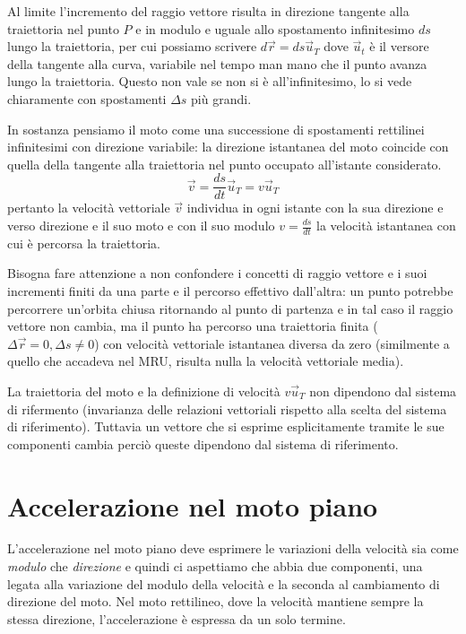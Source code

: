 \documentclass[class=book, crop=false, oneside, 12pt]{standalone}
\begin{document}
Al limite l'incremento del raggio vettore risulta in direzione tangente alla traiettoria nel punto \(P\) e in modulo e uguale allo spostamento infinitesimo \(ds\) lungo la traiettoria, 
per cui possiamo scrivere \(d \overrightarrow{r} = ds \overrightarrow{u}_T\) dove \(\overrightarrow{u}_t\) è il versore della tangente alla curva, variabile nel tempo man mano che il punto avanza lungo la traiettoria. 
Questo non vale se non si è all'infinitesimo, lo si vede chiaramente con spostamenti \(\Delta s\) più grandi.

In sostanza pensiamo il moto come una successione di spostamenti rettilinei infinitesimi con direzione variabile: la direzione istantanea del moto coincide con quella della tangente alla traiettoria nel punto occupato all'istante considerato.
\begin{equation}
  \overrightarrow{v} = \frac{ds}{dt} \overrightarrow{u}_T = v \overrightarrow{u}_T
\end{equation}
pertanto la velocità vettoriale \(\overrightarrow{v}\) individua in ogni istante con la sua direzione e verso direzione e il suo moto e con il suo modulo \(v = \frac{ds}{dt}\) la velocità istantanea con cui è percorsa la traiettoria. 

Bisogna fare attenzione a non confondere i concetti di raggio vettore e i suoi incrementi finiti da una parte e il percorso effettivo dall'altra:
un punto potrebbe percorrere un'orbita chiusa ritornando al punto di partenza e in tal caso il raggio vettore non cambia, ma il punto ha percorso una traiettoria finita (\(\Delta \overrightarrow{r} = 0, \Delta s \neq 0\)) con velocità vettoriale istantanea diversa da zero (similmente a quello che accadeva nel MRU, risulta nulla la velocità vettoriale media).

La traiettoria del moto e la definizione di velocità \(v \overrightarrow{u}_T\) non dipendono dal sistema di rifermento (invarianza delle relazioni vettoriali rispetto alla scelta del sistema di riferimento).
Tuttavia un vettore che si esprime esplicitamente tramite le sue componenti cambia perciò queste dipendono dal sistema di riferimento.

\section{Accelerazione nel moto piano}

L'accelerazione nel moto piano deve esprimere le variazioni della velocità sia come \emph{modulo} che \emph{direzione} e quindi ci aspettiamo che abbia due componenti, 
una legata alla variazione del modulo della velocità e la seconda al cambiamento di direzione del moto. 
Nel moto rettilineo, dove la velocità mantiene sempre la stessa direzione, l'accelerazione è espressa da un solo termine. 
\end{document}
